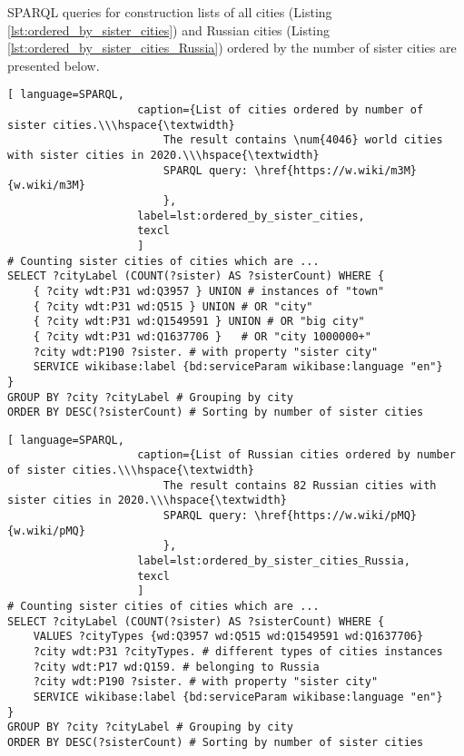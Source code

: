 SPARQL queries for construction lists of all cities (Listing \ref{lst:ordered_by_sister_cities}) and Russian cities (Listing \ref{lst:ordered_by_sister_cities_Russia}) ordered by the number of sister cities are presented below.


\begin{lstlisting}[ language=SPARQL, 
                    caption={List of cities ordered by number of sister cities.\\\hspace{\textwidth}
                        The result contains \num{4046} world cities with sister cities in 2020.\\\hspace{\textwidth}
                        SPARQL query: \href{https://w.wiki/m3M}{w.wiki/m3M}
                        },
                    label=lst:ordered_by_sister_cities,
                    texcl 
                    ]
# Counting sister cities of cities which are ...
SELECT ?cityLabel (COUNT(?sister) AS ?sisterCount) WHERE {           
	{ ?city wdt:P31 wd:Q3957 } UNION # instances of "town"
	{ ?city wdt:P31 wd:Q515 } UNION # OR "city"
	{ ?city wdt:P31 wd:Q1549591 } UNION # OR "big city"
	{ ?city wdt:P31 wd:Q1637706 }	# OR "city 1000000+"
	?city wdt:P190 ?sister. # with property "sister city"
	SERVICE wikibase:label {bd:serviceParam wikibase:language "en"}
}
GROUP BY ?city ?cityLabel # Grouping by city                                   
ORDER BY DESC(?sisterCount) # Sorting by number of sister cities
\end{lstlisting}%

\begin{lstlisting}[ language=SPARQL, 
                    caption={List of Russian cities ordered by number of sister cities.\\\hspace{\textwidth}
                        The result contains 82 Russian cities with sister cities in 2020.\\\hspace{\textwidth}
                        SPARQL query: \href{https://w.wiki/pMQ}{w.wiki/pMQ}
                        },
                    label=lst:ordered_by_sister_cities_Russia,
                    texcl 
                    ]
# Counting sister cities of cities which are ...
SELECT ?cityLabel (COUNT(?sister) AS ?sisterCount) WHERE {           
	VALUES ?cityTypes {wd:Q3957 wd:Q515 wd:Q1549591 wd:Q1637706}
	?city wdt:P31 ?cityTypes. # different types of cities instances
	?city wdt:P17 wd:Q159. # belonging to Russia
	?city wdt:P190 ?sister. # with property "sister city"
	SERVICE wikibase:label {bd:serviceParam wikibase:language "en"}
}
GROUP BY ?city ?cityLabel # Grouping by city
ORDER BY DESC(?sisterCount) # Sorting by number of sister cities
\end{lstlisting}%

